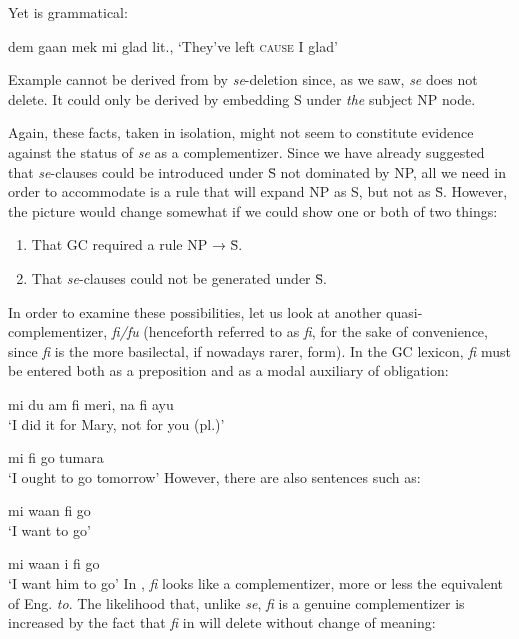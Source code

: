 \z

\z

\noindent Yet  is grammatical:

\ea\label{ex:2:185}
 dem gaan mek mi glad
\glt  lit., `They've left \textsc{cause} I glad'
\z

Example  cannot be derived from  by \textit{se}-deletion since, as we saw, \textit{se} does not delete. It could only be derived by embedding S under \textit{the} subject NP node.

Again, these facts, taken in isolation, might not seem to con\-stitute evidence against the status of \textit{se} as a complementizer. Since we have already suggested that \textit{se}-clauses could be introduced under \=S not dominated by NP, all we need in order to accommodate  is a rule that will expand NP as S, but not as \=S. However, the picture would change somewhat if we could show one or both of two things:

\begin{enumerate}
\item That GC required a rule NP → \=S. \label{GCrequirementcondition}
\item That \textit{se}-clauses could not be generated under \=S. \label{GCrequirementcondition2}
\end{enumerate}

In order to examine these possibilities, let us look at another quasi-
complementizer, \textit{fi/fu} (henceforth referred to as \textit{fi}, for the sake of convenience, since \textit{fi} is the more basilectal, if nowadays rarer, form). In the GC lexicon, \textit{fi} must be entered both as a preposition and as a modal auxiliary of obligation:

\ea\label{ex:2:186}
mi du am fi meri, na fi ayu\\
\glt `I did it for Mary, not for you (pl.)'
\z

\ea\label{ex:2:187}
mi fi go tumara\\
\glt `I ought to go tomorrow'
\z
However, there are also sentences such as:

\ea\label{ex:2:188}
mi waan fi go\\
\glt `I want to go'
\z

\ea\label{ex:2:189}
 mi waan i fi go\\
\glt `I want him to go'
\z
In , \textit{fi} looks like a complementizer, more or less the equivalent of Eng. \textit{to}. The likelihood that, unlike \textit{se}, \textit{fi} is a genuine complementizer is increased by the fact that \textit{fi} in  will delete without change of meaning:

